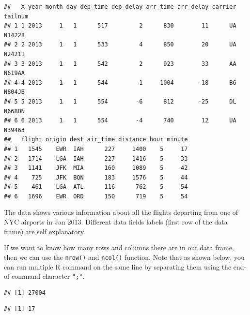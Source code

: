 \documentclass[10pt, letterpaper, twoside]{memoir}\usepackage{knitr}
\begin{document}
\begin{knitrout}
\color{fgcolor}\begin{kframe}
\begin{alltt}
\end{alltt}
\begin{verbatim}
##   X year month day dep_time dep_delay arr_time arr_delay carrier tailnum
## 1 1 2013     1   1      517         2      830        11      UA  N14228
## 2 2 2013     1   1      533         4      850        20      UA  N24211
## 3 3 2013     1   1      542         2      923        33      AA  N619AA
## 4 4 2013     1   1      544        -1     1004       -18      B6  N804JB
## 5 5 2013     1   1      554        -6      812       -25      DL  N668DN
## 6 6 2013     1   1      554        -4      740        12      UA  N39463
##   flight origin dest air_time distance hour minute
## 1   1545    EWR  IAH      227     1400    5     17
## 2   1714    LGA  IAH      227     1416    5     33
## 3   1141    JFK  MIA      160     1089    5     42
## 4    725    JFK  BQN      183     1576    5     44
## 5    461    LGA  ATL      116      762    5     54
## 6   1696    EWR  ORD      150      719    5     54
\end{verbatim}
\end{kframe}
\end{knitrout}

The data shows various information about all the flights departing from one of NYC airports in Jan 2013. Different data fields labels (first row of the data frame) are self explanatory. 

If we want to know how many rows and columns there are in our data frame, then we can use the \texttt{nrow()} and \texttt{ncol()}   function. Note that as shown below, you can run multiple R command on the same line by separating them using the end-of-command character \texttt{";"}.

\begin{knitrout}
\color{fgcolor}\begin{kframe}
\begin{alltt}
\end{alltt}
\begin{verbatim}
## [1] 27004
\end{verbatim}
\begin{alltt}
\end{alltt}
\begin{verbatim}
## [1] 17
\end{verbatim}
\end{kframe}
\end{knitrout}
\end{document}
